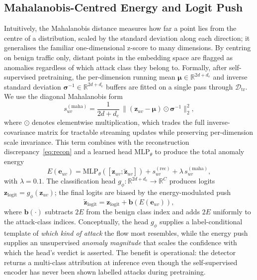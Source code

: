 \documentclass[journal,twoside]{IEEEtran}
\begin{document}
\subsection{Mahalanobis-Centred Energy and Logit Push}
\label{sec:method:energy}
Intuitively, the Mahalanobis distance measures how far a point lies from
the centre of a distribution, scaled by the standard deviation along each
direction; it generalises the familiar one-dimensional z-score to many
dimensions. By centring on benign traffic only, distant points in the
embedding space are flagged as anomalies regardless of which attack class
they belong to. Formally, after self-supervised pretraining, the
per-dimension running mean $\bm{\mu} \in \mathbb{R}^{2d+d_e}$ and inverse
standard deviation $\bm{\sigma}^{-1} \in \mathbb{R}^{2d+d_e}$ buffers are
fitted on a single pass through $\mathcal{D}_\text{tr}$. We use the
diagonal Mahalanobis form
\begin{equation}
s_{uv}^{(\mathrm{maha})} = \frac{1}{2d+d_e}\,\|(\mathbf{z}_{uv} - \bm{\mu}) \odot \bm{\sigma}^{-1}\|_2^2,
\label{eq:maha}
\end{equation}
where $\odot$ denotes elementwise multiplication, which trades the full
inverse-covariance matrix for tractable streaming updates while
preserving per-dimension scale invariance. This term combines with the
reconstruction discrepancy~\eqref{eq:recon} and a learned head
$\mathrm{MLP}_\theta$ to produce the total anomaly energy
\begin{equation}
E(\mathbf{e}_{uv}) = \mathrm{MLP}_\theta([\mathbf{z}_{uv}; \tilde{\mathbf{z}}_{uv}]) + s_{uv}^{(\mathrm{rec})} + \lambda\,s_{uv}^{(\mathrm{maha})},
\label{eq:energy}
\end{equation}
with $\lambda = 0.1$. The classification head $g_\phi: \mathbb{R}^{2d+d_e}
\to \mathbb{R}^{C}$ produces logits $\mathbf{z}_{\mathrm{logit}} =
g_\phi(\mathbf{z}_{uv})$; the final logits are biased by the
energy-modulated push
\begin{equation}
\tilde{\mathbf{z}}_{\mathrm{logit}} = \mathbf{z}_{\mathrm{logit}} + \mathbf{b}(E(\mathbf{e}_{uv})),
\end{equation}
where $\mathbf{b}(\cdot)$ subtracts $2E$ from the benign class index and
adds $2E$ uniformly to the attack-class indices. Conceptually, the head
$g_\phi$ supplies a label-conditional template of \emph{which kind of
attack} the flow most resembles, while the energy push supplies an
unsupervised \emph{anomaly magnitude} that scales the confidence with
which the head's verdict is asserted. The benefit is operational: the
detector returns a multi-class attribution at inference even though the
self-supervised encoder has never been shown labelled attacks during
pretraining.
\end{document}
